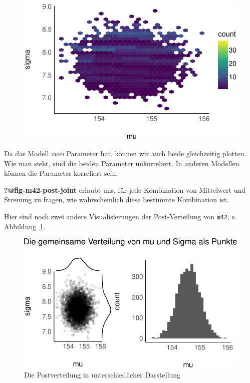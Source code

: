 \documentclass[
  a4paper,
  DIV=11]{scrreprt}
\theoremstyle{definition}
\theoremstyle{remark}
\begin{document}
\begin{figure}[H]

{\centering \includegraphics{./gauss_files/figure-pdf/echo- true label- fig-m42-post-joint fig-cap- Die gemeinsame Verteilung von Mittelwert und Streuung.-1.pdf}

}

\end{figure}

Da das Modell \emph{zwei} Parameter hat, können wir auch beide
gleichzeitig plotten. Wie man sieht, sind die beiden Parameter
unkorreliert. In anderen Modellen können die Parameter korreliert sein.

\textbf{?@fig-m42-post-joint} erlaubt uns, für jede Kombination von
Mittelwert und Streuung zu fragen, wie wahrscheinlich diese bestimmte
Kombination ist.

Hier sind noch zwei andere Visualisierungen der Post-Verteilung von
\texttt{m42}, s. Abbildung~\ref{fig-m42-post-anders}.

\begin{figure}

{\centering \includegraphics{./gauss_files/figure-pdf/fig-m42-post-anders-1.pdf}

}

\caption{\label{fig-m42-post-anders}Die Postverteilung in
unterschiedlicher Darstellung}

\end{figure}
\end{document}
